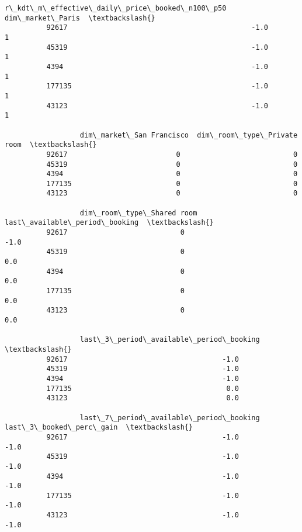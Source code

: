 \documentclass[11pt]{article}
\begin{document}
\begin{Verbatim}[commandchars=\\\{\}]
                  r\_kdt\_m\_effective\_daily\_price\_booked\_n100\_p50  dim\_market\_Paris  \textbackslash{}
          92617                                            -1.0                 1   
          45319                                            -1.0                 1   
          4394                                             -1.0                 1   
          177135                                           -1.0                 1   
          43123                                            -1.0                 1   
          
                  dim\_market\_San Francisco  dim\_room\_type\_Private room  \textbackslash{}
          92617                          0                           0   
          45319                          0                           0   
          4394                           0                           0   
          177135                         0                           0   
          43123                          0                           0   
          
                  dim\_room\_type\_Shared room  last\_available\_period\_booking  \textbackslash{}
          92617                           0                           -1.0   
          45319                           0                            0.0   
          4394                            0                            0.0   
          177135                          0                            0.0   
          43123                           0                            0.0   
          
                  last\_3\_period\_available\_period\_booking  \textbackslash{}
          92617                                     -1.0   
          45319                                     -1.0   
          4394                                      -1.0   
          177135                                     0.0   
          43123                                      0.0   
          
                  last\_7\_period\_available\_period\_booking  last\_3\_booked\_perc\_gain  \textbackslash{}
          92617                                     -1.0                     -1.0   
          45319                                     -1.0                     -1.0   
          4394                                      -1.0                     -1.0   
          177135                                    -1.0                     -1.0   
          43123                                     -1.0                     -1.0   
          

\end{Verbatim}
\end{document}
